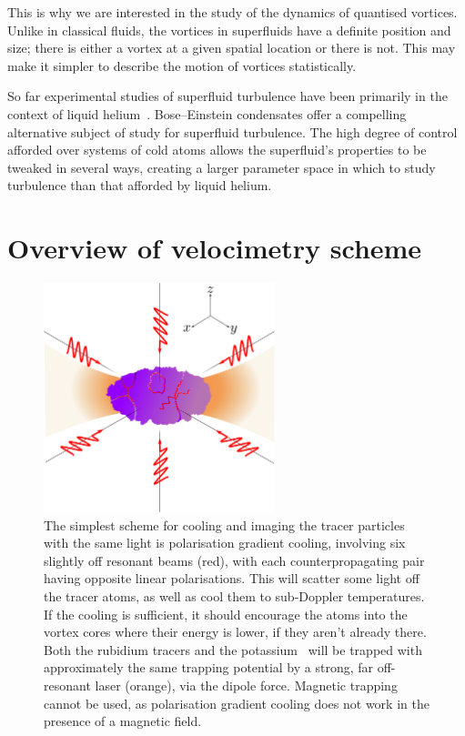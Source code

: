 This is why we are interested in the study of the dynamics of quantised vortices. Unlike in classical fluids, the vortices in superfluids have a definite position and size; there is either a vortex at a given spatial location or there is not. This may make it simpler to describe the motion of vortices statistically.

So far experimental studies of superfluid turbulence have been primarily in the context of liquid helium~\cite{leggett_superfluidity_1999}. Bose--Einstein condensates offer a compelling alternative subject of study for superfluid turbulence. The high degree of control afforded over systems of cold atoms allows the superfluid's properties to be tweaked in several ways, creating a larger parameter space in which to study turbulence than that afforded by liquid helium.

\section{Overview of velocimetry scheme}

\begin{figure}
\begin{center}
\includegraphics[width=0.6\textwidth]{figures/unsorted/setup.png}
\caption{\label{fig:setup}The simplest scheme for cooling and imaging the tracer particles with the same light is polarisation gradient cooling, involving six slightly off resonant beams (red), with each counterpropagating pair having opposite linear polarisations. This will scatter some light off the tracer atoms, as well as cool them to sub-Doppler temperatures. If the cooling is sufficient, it should encourage the atoms into the vortex cores where their energy is lower, if they aren't already there. Both the rubidium tracers and the potassium \bec\ will be trapped with approximately the same trapping potential by a strong, far off-resonant laser (orange), via the dipole force. Magnetic trapping cannot be used, as polarisation gradient cooling does not work in the presence of a magnetic field.}
\end{center}
\end{figure}

